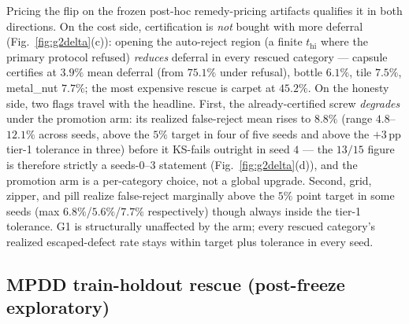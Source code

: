\documentclass[preprint,11pt]{elsarticle}
\begin{document}
Pricing the flip on the
frozen post-hoc remedy-pricing artifacts qualifies it in both directions. On the cost
side, certification is \emph{not} bought with more deferral (Fig.~\ref{fig:g2delta}(c)): opening the auto-reject region
(a finite $t_{\text{hi}}$ where the primary protocol refused) \emph{reduces} deferral in every
rescued category --- capsule certifies at $3.9\%$ mean deferral (from $75.1\%$ under refusal),
bottle $6.1\%$, tile $7.5\%$, metal\_nut $7.7\%$; the most expensive rescue is carpet at
$45.2\%$. On the honesty side, two flags travel with the headline. First, the already-certified
screw \emph{degrades} under the promotion arm: its realized false-reject mean rises to $8.8\%$
(range $4.8$--$12.1\%$ across seeds, above the $5\%$ target in four of five seeds and above the
$+3$\,pp tier-1 tolerance in three) before it KS-fails outright in seed $4$ --- the $13/15$
figure is therefore strictly a seeds-$0$--$3$ statement (Fig.~\ref{fig:g2delta}(d)), and the promotion arm is a per-category
choice, not a global upgrade. Second, grid, zipper, and pill realize false-reject marginally
above the $5\%$ point target in some seeds (max $6.8\%$/$5.6\%$/$7.7\%$ respectively) though
always inside the tier-1 tolerance. G1 is structurally unaffected by the arm; every rescued
category's realized escaped-defect rate stays within target plus tolerance in every seed.

\subsection{MPDD train-holdout rescue (post-freeze exploratory)}
\label{sec:mpddholdout}
\end{document}
